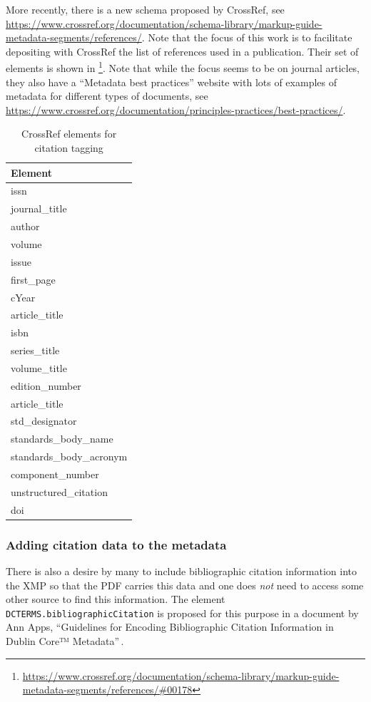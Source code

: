 More recently, there is a new schema proposed by CrossRef, see \url{https://www.crossref.org/documentation/schema-library/markup-guide-metadata-segments/references/}. Note that the focus of this work is to facilitate depositing with CrossRef the list of references used in a publication. Their set of elements is shown in \footnote{\url{https://www.crossref.org/documentation/schema-library/markup-guide-metadata-segments/references/\#00178}}. Note that while the focus seems to be on journal articles, they also have a ``Metadata best practices'' website with lots of examples of metadata for different types of documents, see \url{https://www.crossref.org/documentation/principles-practices/best-practices/}.

\begin{table}[!ht]
    \caption{CrossRef elements for citation tagging}
    \label{tab:crossRefElementsForCitationTagging}
    \begin{tabular}{l}
      \textbf{Element}\\
      \hline
issn\\
journal\_title\\
author\\
volume\\
issue\\
first\_page\\
cYear\\
article\_title\\
isbn\\
series\_title\\
volume\_title\\
edition\_number\\
article\_title\\
std\_designator\\
standards\_body\_name\\
standards\_body\_acronym\\
component\_number\\
unstructured\_citation\\
doi\\
\end{tabular}
\end{table}

\subsubsection{Adding citation data to the metadata}
\label{sec:addingCitation}
There is also a desire by many to include bibliographic citation information into the XMP so that the PDF carries this data and one does \emph{not} need to access some other source to find this information. The element \texttt{DCTERMS.bibliographicCitation} is proposed for this purpose in a document by Ann Apps, ``Guidelines for Encoding Bibliographic Citation Information in Dublin Core™ Metadata''\,\cite{Ann_Apps_2005}.

